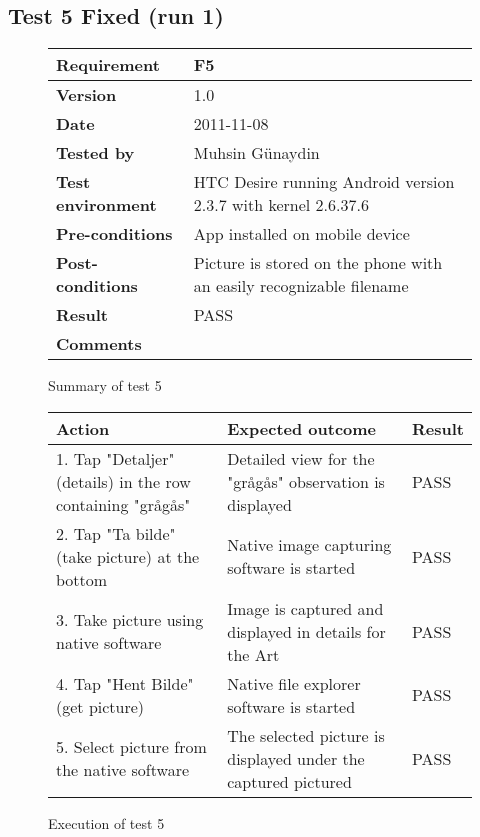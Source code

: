 
\subsection*{Test 5 Fixed (run 1)}

	\begin{figure}[htb]
		\centering
		\begin{tabular}{|p{3.5cm}|p{7.0cm}|} \hline
			\textbf{Requirement} & F5 \\ \hline
			\textbf{Version} & 1.0 \\ \hline
			\textbf{Date} & 2011-11-08 \\ \hline
			\textbf{Tested by} & Muhsin Günaydin \\ \hline
			\textbf{Test environment} & HTC Desire running Android version 2.3.7 with kernel 2.6.37.6 \\ \hline
			\textbf{Pre-conditions} & App installed on mobile device \\ \hline
			\textbf{Post-conditions} & Picture is stored on the phone with an easily recognizable filename \\ \hline
			\textbf{Result} & PASS \\ \hline
			\textbf{Comments} & \\ \hline
		\end{tabular}
		\caption{Summary of test 5}
	\end{figure}

	\begin{figure}[htb]
		\centering
		\begin{tabular}{|p{5.0cm}|p{5.0cm}|p{1cm}|}
			\hline \textbf{Action} & \textbf{Expected outcome} & \textbf{Result} \\ \hline
			1. Tap "Detaljer" (details) in the row containing "grågås"  &
			Detailed view for the "grågås" observation is displayed & 
			PASS \\ \hline

			2. Tap "Ta bilde" (take picture) at the bottom &
			Native image capturing software is started &
			PASS\\ \hline

			3. Take picture using native software &
			Image is captured and displayed in details for the Art &
			PASS\\ \hline
			
			4. Tap "Hent Bilde" (get picture) &
			Native file explorer software is started &
			PASS\\ \hline

			5. Select picture from the native software &
			The selected picture is displayed under the captured pictured &
			PASS\\ \hline
		
		\end{tabular}
		\caption{Execution of test 5}
	\end{figure}


\newpage
